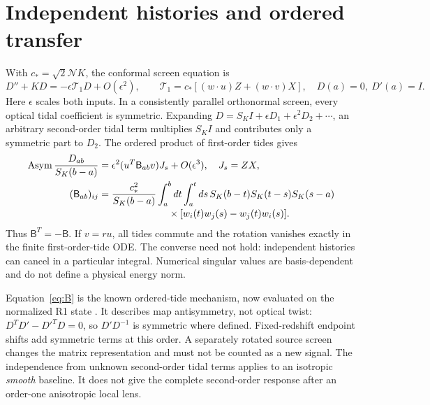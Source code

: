 \documentclass[11pt,a4paper]{article}
\newcommand{\NN}{\mathcal N}\newcommand{\RR}{\mathcal R}
\begin{document}
\section{Independent histories and ordered transfer}
\label{sec:rotation}

With $c_*=\sqrt2\NN K$, the conformal screen equation is
\begin{equation}
 D''+KD=-\epsilon\mathcal T_1D+O(\epsilon^2),\qquad
 \mathcal T_1=c_*[(w\cdot u)Z+(w\cdot v)X],\quad
 D(a)=0,\ D'(a)=I.
 \label{eq:jacobi}
\end{equation}
Here $\epsilon$ scales both inputs. In a consistently parallel
orthonormal screen, every optical tidal coefficient is symmetric.
Expanding $D=S_K I+\epsilon D_1+\epsilon^2D_2+\cdots$, an arbitrary
second-order tidal term multiplies $S_K I$ and contributes only a
symmetric part to $D_2$. The ordered product of first-order tides gives
\begin{align}
 \asympart\frac{D_{ab}}{S_K(b-a)}
 &=\epsilon^2(u^T\mathsf B_{ab}v)J_s+O(\epsilon^3),\quad J_s=ZX,
 \label{eq:bilinear}\\
 (\mathsf B_{ab})_{ij}
 &=\frac{c_*^2}{S_K(b-a)}\int_a^bdt\int_a^tds\,
 S_K(b-t)S_K(t-s)S_K(s-a)\nonumber\\[-2pt]
 &\hspace{25mm}\times[w_i(t)w_j(s)-w_j(t)w_i(s)].
 \label{eq:B}
\end{align}
Thus $\mathsf B^T=-\mathsf B$. If $v=ru$, all tides commute and
the rotation vanishes exactly in the finite first-order-tide ODE.
The converse need not hold: independent histories can cancel in a
particular integral. Numerical singular values are basis-dependent
and do not define a physical energy norm.

Equation~\eqref{eq:B} is the known ordered-tide mechanism, now evaluated
on the normalized R1 state \cite{Magi2026Rotation}. It describes map
antisymmetry, not optical twist: $D^TD'-D'^TD=0$, so $D'D^{-1}$ is
symmetric where defined. Fixed-redshift endpoint shifts add symmetric
terms at this order. A separately rotated source screen changes the
matrix representation and must not be counted as a new signal.
The independence from unknown second-order tidal terms applies to an
isotropic \emph{smooth} baseline. It does not give the complete
second-order response after an order-one anisotropic local lens.
\end{document}
